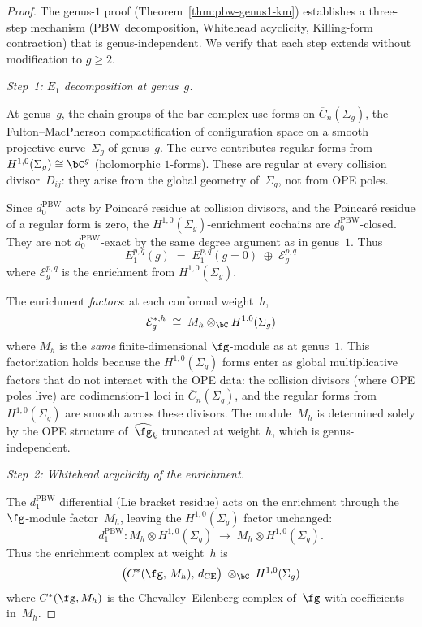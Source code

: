 \begin{proof}
The genus-$1$ proof
(Theorem~\ref{thm:pbw-genus1-km}) establishes a
three-step mechanism (PBW decomposition, Whitehead
acyclicity, Killing-form contraction) that is
genus-independent.  We verify that each step
extends without modification to $g \geq 2$.

\medskip
\emph{Step~1: $E_1$ decomposition at genus~$g$.}

At genus~$g$, the chain groups of the bar complex use
forms on $\overline{C}_n(\Sigma_g)$, the
Fulton--MacPherson compactification of configuration
space on a smooth projective curve~$\Sigma_g$ of
genus~$g$.  The curve contributes regular forms
from $H^{1,0}(\Sigma_g) \cong \bC^g$ (holomorphic
$1$-forms).  These are regular at every collision
divisor~$D_{ij}$: they arise from the global geometry
of~$\Sigma_g$, not from OPE poles.

Since $d_0^{\mathrm{PBW}}$ acts by Poincar\'{e} residue at
collision divisors, and the Poincar\'{e} residue of a
regular form is zero, the $H^{1,0}(\Sigma_g)$-enrichment
cochains are $d_0^{\mathrm{PBW}}$-closed.  They are not
$d_0^{\mathrm{PBW}}$-exact by the same degree argument
as in genus~$1$.  Thus
\begin{equation}\label{eq:e1-decomposition-genusg}
E_1^{p,q}(g) \;=\; E_1^{p,q}(g{=}0)
  \;\oplus\; \mathcal{E}^{p,q}_g
\end{equation}
where $\mathcal{E}^{p,q}_g$ is the enrichment from
$H^{1,0}(\Sigma_g)$.

The enrichment
\emph{factors}: at each conformal weight~$h$,
\begin{equation}\label{eq:enrichment-factorization}
\mathcal{E}_g^{*,h}
\;\cong\; M_h \otimes_{\bC} H^{1,0}(\Sigma_g)
\end{equation}
where $M_h$ is the \emph{same} finite-dimensional
$\fg$-module as at genus~$1$.
This factorization holds because the
$H^{1,0}(\Sigma_g)$ forms enter as global
multiplicative factors that do not interact with the
OPE data: the collision divisors (where OPE poles live)
are codimension-$1$ loci in $\overline{C}_n(\Sigma_g)$,
and the regular forms from $H^{1,0}(\Sigma_g)$ are
smooth across these divisors.  The module~$M_h$ is
determined solely by the OPE structure of~$\widehat{\fg}_k$
truncated at weight~$h$, which is genus-independent.

\medskip
\emph{Step~2: Whitehead acyclicity of the enrichment.}

The $d_1^{\mathrm{PBW}}$ differential (Lie bracket residue)
acts on the enrichment through the $\fg$-module factor~$M_h$,
leaving the $H^{1,0}(\Sigma_g)$ factor unchanged:
\[
d_1^{\mathrm{PBW}}\colon
M_h \otimes H^{1,0}(\Sigma_g)
\;\longrightarrow\;
M_{h} \otimes H^{1,0}(\Sigma_g).
\]
Thus the enrichment complex at weight~$h$ is
\[
\bigl(C^*(\fg,\, M_h),\, d_{\mathrm{CE}}\bigr)
\;\otimes_{\bC}\;
H^{1,0}(\Sigma_g)
\]
where $C^*(\fg, M_h)$ is the Chevalley--Eilenberg
complex of~$\fg$ with coefficients in~$M_h$.


\end{proof}
